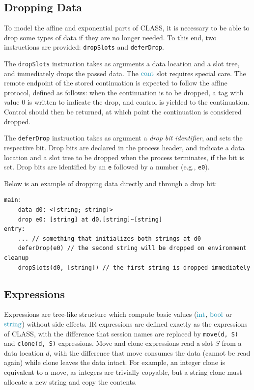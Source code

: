 \subsection{Dropping Data} \label{subsection:IRDroppingData}

To model the affine and exponential parts of \ac{CLASS}, it is necessary to be able to drop some types of data if they are no longer needed. To this end, two instructions are provided: \texttt{dropSlots} and \texttt{deferDrop}.

The \texttt{dropSlots} instruction takes as arguments a data location and a slot tree, and immediately drops the passed data. The $\conts$ slot requires special care. The remote endpoint of the stored continuation is expected to follow the affine protocol, defined as follows: when the continuation is to be dropped, a tag with value $0$ is written to indicate the drop, and control is yielded to the continuation. Control should then be returned, at which point the continuation is considered dropped.

The \texttt{deferDrop} instruction takes as argument a \textit{drop bit identifier}, and sets the respective bit. Drop bits are declared in the process header, and indicate a data location and a slot tree to be dropped when the process terminates, if the bit is set. Drop bits are identified by an \texttt{e} followed by a number (e.g., \texttt{e0}).

Below is an example of dropping data directly and through a drop bit:
\begin{lstlisting}[language=IR,frame=bottom]
main:
    data d0: <[string; string]>
    drop e0: [string] at d0.[string]~[string]
entry:
    ... // something that initializes both strings at d0
    deferDrop(e0) // the second string will be dropped on environment cleanup
    dropSlots(d0, [string]) // the first string is dropped immediately
\end{lstlisting}

\subsection{Expressions}

Expressions are tree-like structure which compute basic values ($\ints$, $\bools$ or $\strings$) without side effects. \ac{IR} expressions are defined exactly as the expressions of \ac{CLASS}, with the difference that session names are replaced by \texttt{move(d, S)} and \texttt{clone(d, S)} expressions. Move and clone expressions read a slot $S$ from a data location $d$, with the difference that move consumes the data (cannot be read again) while clone leaves the data intact. For example, an integer clone is equivalent to a move, as integers are trivially copyable, but a string clone must allocate a new string and copy the contents.

